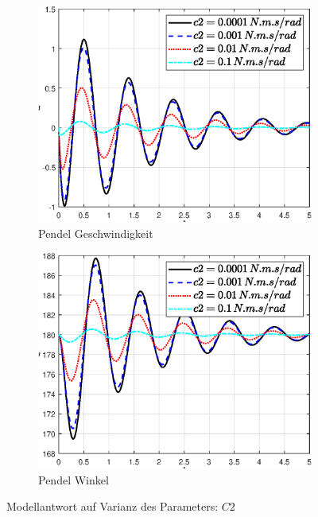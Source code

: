 \begin{figure}
    \begin{subfigure}[b]{0.49\linewidth}
        \includegraphics[width=\linewidth]{Bilder/5_sensi/fig/c2/theta_punkt.eps}
        \caption{Pendel Geschwindigkeit}
        \label{fig:c2_theta_punkt}      
    \end{subfigure}
    \begin{subfigure}[b]{0.49\linewidth}
        \includegraphics[width=\linewidth]{Bilder/5_sensi/fig/c2/theta.eps}
        \caption{Pendel Winkel}
        \label{fig:c2_theta}
    \end{subfigure}
        \caption{Modellantwort auf Varianz des Parameters: $C2$}
        \label{fig:c2}
\end{figure}

